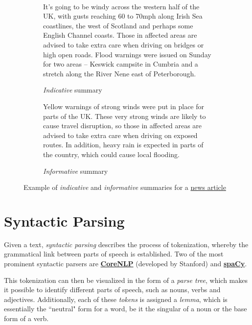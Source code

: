 \begin{figure}[H]\
\begin{subfigure}{\textwidth}
\begin{displayquote}
It’s going to be windy across the western half of the UK, with gusts reaching 60 to 70mph along Irish Sea coastlines, the west of Scotland and perhaps some English Channel coasts. Those in affected areas are advised to take extra care when driving on bridges or high open roads. Flood warnings were issued on Sunday for two areas – Keswick campsite in Cumbria and a stretch along the River Nene east of Peterborough.
\end{displayquote}
\caption{\textit{Indicative} summary}
\vspace{\baselineskip}
\end{subfigure}
\begin{subfigure}{\textwidth}
\begin{displayquote}
Yellow warnings of strong winds were put in place for parts of the UK. These very strong winds are likely to cause travel disruption, so those in affected areas are advised to take extra care when driving on exposed routes. In addition, heavy rain is expected in parts of the country, which could cause local flooding.
\caption{\textit{Informative} summary}
\end{displayquote}
\end{subfigure}
\caption{Example of \textit{indicative} and \textit{informative} summaries for a \href{https://www.theguardian.com/uk-news/2020/jan/12/storm-brendan-gales-forecast-uk}{news article}}
\label{fig:indicative_informative_summaries}
\end{figure}

\section{Syntactic Parsing}

Given a text, \textit{syntactic parsing} \cite{noauthor_syntactic_nodate} describes the process of tokenization, whereby the grammatical link between parts of speech is established. Two of the most prominent syntactic parsers are \textbf{\href{https://corenlp.run}{CoreNLP}} (developed by Stanford) and \textbf{\href{https://spacy.io}{spaCy}}.

This tokenization can then be visualized in the form of a \textit{parse tree}, which makes it possible to identify different parts of speech, such as nouns, verbs and adjectives. Additionally, each of these \textit{tokens} is assigned a \textit{lemma}, which is essentially the ``neutral" form for a word, be it the singular of a noun or the base form of a verb.


